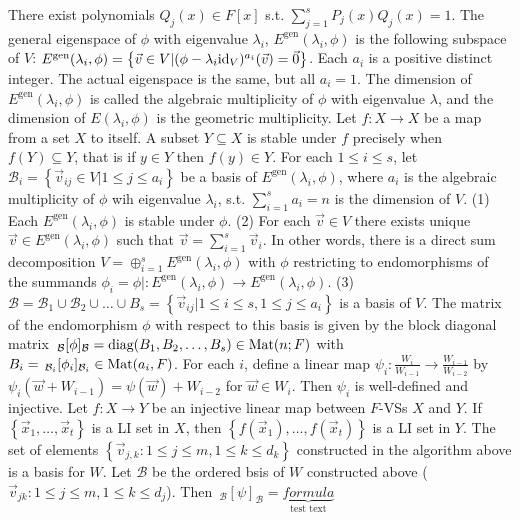  There exist polynomials $Q_j(x) \in F[x]$ s.t. $\sum_{j=1}^sP_j(x)Q_j(x) = 1$.
 The general eigenspace of $\phi$ with eigenvalue $\lambda_i$, $E^{\mathrm{gen}}(\lambda_i, \phi)$ is the following subspace of $V$: $E^{\mathrm{gen}}(\lambda_i, \phi) = \left\{ \vec{v} \in V | (\phi - \lambda_i \text{id}_V)^{a_i}(\vec{v}) = \vec{0} \right\}$. Each $a_i$ is a positive distinct integer. The actual eigenspace is the same, but all $a_i=1$. The dimension of $E^\mathrm{gen} (\lambda_i, \phi)$ is called the algebraic multiplicity of $\phi$ with eigenvalue $\lambda$, and the dimension of $E(\lambda_i, \phi)$ is the geometric multiplicity. 
 Let $f : X \to X$ be a map from a set $X$ to itself. A subset $Y \subseteq X$ is stable under $f$ precisely when $f(Y) \subseteq Y$, that is if $y \in Y$ then $f(y) \in Y$.
 For each $1 \le i \le s$, let $\mathcal{B}_i = \left\{ \vec{v}_{ij} \in V | 1 \le j \le a_i \right\}$ be a basis of $E^{\mathrm{gen}}(\lambda_i, \phi)$, where $a_i$ is the algebraic multiplicity of $\phi$ wih eigenvalue $\lambda_i$, s.t. $\sum_{i=1}^s a_i = n$ is the dimension of $V$.
(1) Each $E^\mathrm{gen} (\lambda_i, \phi)$ is stable under $\phi$.
(2) For each $\vec{v} \in V$ there exists unique $\vec{v} \in E^\mathrm{gen} (\lambda_i, \phi)$ such that $\vec{v} = \sum_{i=1}^s \vec{v}_i$. In other words, there is a direct sum decomposition $V = \oplus_{i=1}^s E^\mathrm{gen} (\lambda_i, \phi)$ with $\phi$ restricting to endomorphisms of the summands $\phi_i = \phi| : E^\mathrm{gen} (\lambda_i, \phi) \to E^\mathrm{gen} (\lambda_i, \phi)$.
(3) $\mathcal{B} = \mathcal{B}_1 \cup \mathcal{B}_2 \cup \dots \cup B_s = \left\{ \vec{v}_{ij} | 1 \le i \le s, 1 \le j \le a_i \right\}$ is a basis of $V$. The matrix of the endomorphism $\phi$ with respect to this basis is given by the block diagonal matrix $\,_{\mathcal{B}}[\phi]_{\mathcal{B}} = \text{diag}(B_1, B_2, \dots, B_s) \in \text{Mat}(n; F)$ with $B_i = \,_{\mathcal{B}_i}[\phi_i]_{\mathcal{B}_i} \in \text{Mat}(a_i, F)$.
 For each $i$, define a linear map $\psi_i : \frac{W_i}{W_{i-1}} \to \frac{W_{i-1}}{W_{i-2}}$ by $\psi_i(\vec{w} + W_{i-1}) = \psi(\vec{w}) + W_{i-2}$ for $\vec{w} \in W_i$. Then $\psi_i$ is well-defined and injective.
 Let $f : X \to Y$ be an injective linear map between $F$-VSs $X$ and $Y$. If $\left\{ \vec{x}_1, \dots, \vec{x}_t \right\}$ is a LI set in $X$, then $\left\{ f(\vec{x}_1), \dots, f(\vec{x}_t) \right\}$ is a LI set in $Y$.
 The set of elements $\left\{ \vec{v}_{j,k} : 1 \le j \le m, 1 \le k \le d_k \right\}$ constructed in the algorithm above is a basis for $W$.
 Let $\mathcal{B}$ be the ordered bsis of $W$ constructed above ($\vec{v}_{jk} : 1 \le j \le m, 1 \le k \le d_j$). Then
$\,_{\mathcal{B}}[\psi]_{\mathcal{B}} = \underbrace{formula}_{\text{test text}}$
